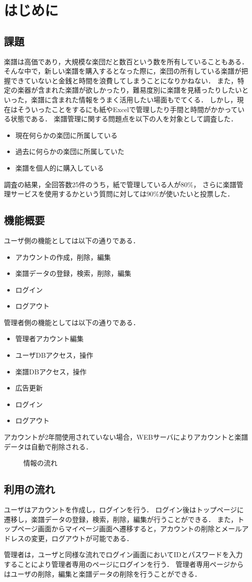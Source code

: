 \chapter{はじめに}
\section{課題}
楽譜は高価であり，大規模な楽団だと数百という数を所有していることもある．
そんな中で，新しい楽譜を購入するとなった際に，楽団の所有している楽譜が把握できていないと金銭と時間を浪費してしまうことになりかねない．
また，特定の楽器が含まれた楽譜が欲しかったり，難易度別に楽譜を見繕ったりしたいといった，楽譜に含まれた情報をうまく活用したい場面もでてくる．
しかし，現在はそういったことをするにも紙やExcelで管理したり手間と時間がかかっている状態である．
楽譜管理に関する問題点を以下の人を対象として調査した．
\begin{itemize}
    \item 現在何らかの楽団に所属している
    \item 過去に何らかの楽団に所属していた
    \item 楽譜を個人的に購入している
\end{itemize}
調査の結果，全回答数25件のうち，紙で管理している人が80\%，
さらに楽譜管理サービスを使用するかという質問に対しては90\%が使いたいと投票した．
\section{機能概要}
ユーザ側の機能としては以下の通りである．
\begin{itemize}
    \item アカウントの作成，削除，編集
    \item 楽譜データの登録，検索，削除，編集
    \item ログイン
    \item ログアウト
\end{itemize}
管理者側の機能としては以下の通りである．
\begin{itemize}
    \item 管理者アカウント編集
    \item ユーザDBアクセス，操作
    \item 楽譜DBアクセス，操作
    \item 広告更新
    \item ログイン
    \item ログアウト
\end{itemize}
アカウントが2年間使用されていない場合，WEBサーバによりアカウントと楽譜データは自動で削除される．
\begin{figure}[h]
    \centering
    
    \caption{情報の流れ}
\end{figure}
\section{利用の流れ}
ユーザはアカウントを作成し，ログインを行う．
ログイン後はトップページに遷移し，楽譜データの登録，検索，削除，編集が行うことができる．
また，トップページ画面からマイページ画面へ遷移すると，アカウントの削除とメールアドレスの変更，ログアウトが可能である．\par
管理者は，ユーザと同様な流れでログイン画面においてIDとパスワードを入力することにより管理者専用のページにログインを行う．
管理者専用ページからはユーザの削除，編集と楽譜データの削除を行うことができる．